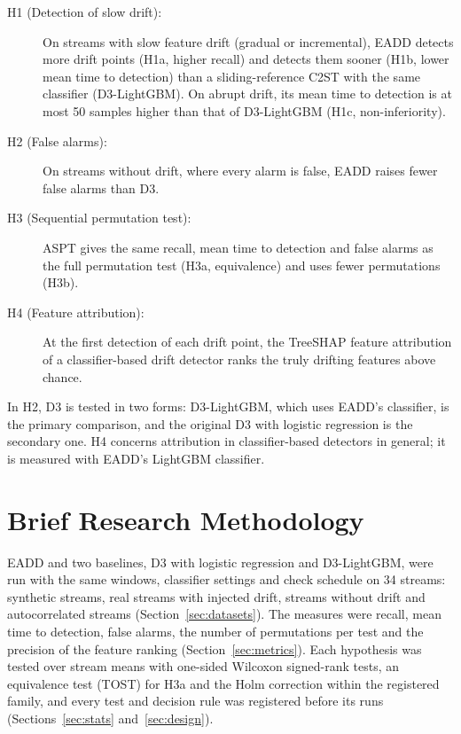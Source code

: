 \newcommand{\hypHone}{On streams with slow feature drift (gradual or incremental), EADD detects more drift points (H1a, higher recall) and detects them sooner (H1b, lower mean time to detection) than a sliding-reference C2ST with the same classifier (D3-LightGBM). On abrupt drift, its mean time to detection is at most 50 samples higher than that of D3-LightGBM (H1c, non-inferiority).}
\newcommand{\hypHtwo}{On streams without drift, where every alarm is false, EADD raises fewer false alarms than D3.}
\newcommand{\hypHthree}{ASPT gives the same recall, mean time to detection and false alarms as the full permutation test (H3a, equivalence) and uses fewer permutations (H3b).}
\newcommand{\hypHfour}{At the first detection of each drift point, the TreeSHAP feature attribution of a classifier-based drift detector ranks the truly drifting features above chance.}
\begin{description}
    \item[H1 (Detection of slow drift):] \hypHone
    \item[H2 (False alarms):] \hypHtwo
    \item[H3 (Sequential permutation test):] \hypHthree
    \item[H4 (Feature attribution):] \hypHfour
\end{description}
In H2, D3 is tested in two forms: D3-LightGBM, which uses EADD's classifier, is the primary comparison, and the original D3 with logistic regression is the secondary one. H4 concerns attribution in classifier-based detectors in general; it is measured with EADD's LightGBM classifier.

\section{Brief Research Methodology}
\label{sec:brief-method}
EADD and two baselines, D3 with logistic regression and D3-LightGBM, were run with the same windows, classifier settings and check schedule on 34 streams: synthetic streams, real streams with injected drift, streams without drift and autocorrelated streams (Section~\ref{sec:datasets}). The measures were recall, mean time to detection, false alarms, the number of permutations per test and the precision of the feature ranking (Section~\ref{sec:metrics}). Each hypothesis was tested over stream means with one-sided Wilcoxon signed-rank tests, an equivalence test (TOST) for H3a and the Holm correction within the registered family, and every test and decision rule was registered before its runs (Sections~\ref{sec:stats} and~\ref{sec:design}).

